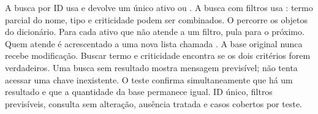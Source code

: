 
 A busca por ID usa  e devolve um único ativo ou . A busca com filtros usa : termo parcial do nome, tipo e criticidade podem ser combinados.
 O  percorre os objetos do dicionário. Para cada ativo que não atende a um filtro,  pula para o próximo. Quem atende é acrescentado a uma nova lista chamada . A base original nunca recebe modificação.
 Buscar termo  e criticidade  encontra  se os dois critérios forem verdadeiros. Uma busca sem resultado mostra mensagem previsível; não tenta acessar uma chave inexistente.
 O teste  confirma simultaneamente que há um resultado e que a quantidade da base permanece igual.
 ID único, filtros previsíveis, consulta sem alteração, ausência tratada e casos cobertos por teste.

